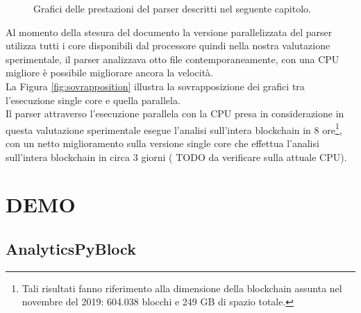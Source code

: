 \begin{figure}
	\centering
	\caption{Grafici delle prestazioni del parser descritti nel seguente capitolo.}
	\label{fig:analisisScript}
\end{figure}

Al momento della stesura del documento la versione parallelizzata del parser utilizza tutti i core disponibili dal processore quindi nella nostra valutazione sperimentale, il parser analizzava otto file contemporaneamente, con una CPU migliore è possibile migliorare ancora la velocità.\\
La Figura \ref{fig:sovrapposition} illustra la sovrapposizione dei grafici tra l'esecuzione single core e quella parallela.\\
Il parser attraverso l'esecuzione parallela con la CPU presa in considerazione in questa valutazione sperimentale esegue l'analisi sull'intera blockchain in 8 ore\footnote{Tali risultati fanno riferimento alla dimensione della blockchain assunta nel novembre del 2019: 604.038 blocchi e 249 GB di spazio totale.}, con un netto miglioramento sulla versione single core che effettua l'analisi sull'intera blockchain in circa 3 giorni ( TODO da verificare sulla attuale CPU).

\section{DEMO} \label{sec:solDemo}
\subsection{AnalyticsPyBlock} \label{sec:AnalyticsPyBlock}

